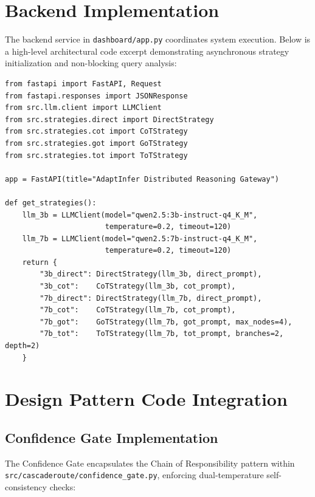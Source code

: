 \documentclass[12pt,a4paper]{report}
\begin{document}
\section{Backend Implementation}
\label{sec:backend_implementation}
The backend service in \texttt{dashboard/app.py} coordinates system execution. Below is a high-level architectural code excerpt demonstrating asynchronous strategy initialization and non-blocking query analysis:

\begin{verbatim}
from fastapi import FastAPI, Request
from fastapi.responses import JSONResponse
from src.llm.client import LLMClient
from src.strategies.direct import DirectStrategy
from src.strategies.cot import CoTStrategy
from src.strategies.got import GoTStrategy
from src.strategies.tot import ToTStrategy

app = FastAPI(title="AdaptInfer Distributed Reasoning Gateway")

def get_strategies():
    llm_3b = LLMClient(model="qwen2.5:3b-instruct-q4_K_M", 
                       temperature=0.2, timeout=120)
    llm_7b = LLMClient(model="qwen2.5:7b-instruct-q4_K_M", 
                       temperature=0.2, timeout=120)
    return {
        "3b_direct": DirectStrategy(llm_3b, direct_prompt),
        "3b_cot":    CoTStrategy(llm_3b, cot_prompt),
        "7b_direct": DirectStrategy(llm_7b, direct_prompt),
        "7b_cot":    CoTStrategy(llm_7b, cot_prompt),
        "7b_got":    GoTStrategy(llm_7b, got_prompt, max_nodes=4),
        "7b_tot":    ToTStrategy(llm_7b, tot_prompt, branches=2, depth=2)
    }
\end{verbatim}

\section{Design Pattern Code Integration}
\label{sec:pattern_code_integration}

\subsection{Confidence Gate Implementation}
The Confidence Gate encapsulates the Chain of Responsibility pattern within \texttt{src/cascaderoute/confidence_gate.py}, enforcing dual-temperature self-consistency checks:
\end{document}
